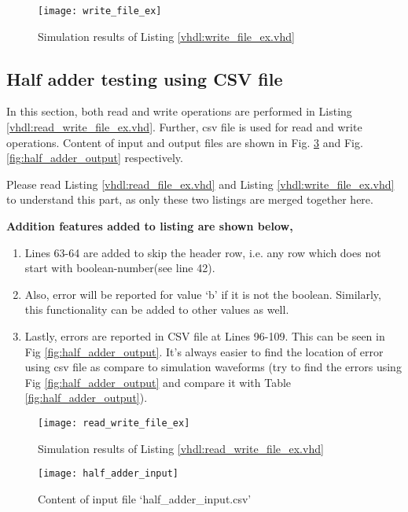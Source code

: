 \begin{figure}[!h]
	\centering
	\texttt{[image: write\_file\_ex]}
	\caption{Simulation results of Listing \ref{vhdl:write_file_ex.vhd} }
	\label{fig:write_file_ex}
\end{figure}


\subsection{Half adder testing using CSV file}
In this section, both read and write operations are performed in Listing \ref{vhdl:read_write_file_ex.vhd}. Further, csv file is used for read and write operations. Content of input and output files are shown in Fig. \ref{fig:half_adder_input} and Fig. \ref{fig:half_adder_output} respectively. 

Please read Listing \ref{vhdl:read_file_ex.vhd} and Listing \ref{vhdl:write_file_ex.vhd} to understand this part, as only these two listings are merged together here. 

\textbf{Addition features added to listing are shown below, }
\begin{enumerate}
	\item Lines 63-64 are added to skip the header row, i.e. any row which does not start with boolean-number(see line 42).
	\item  Also, error will be reported for value `b' if it is not the boolean. Similarly, this functionality can be added to other values as well.
	\item Lastly, errors are reported in CSV file at Lines 96-109. This can be seen in Fig \ref{fig:half_adder_output}. It's always easier to find the location of error using csv file as compare to simulation waveforms (try to find the errors using Fig \ref{fig:half_adder_output} and compare it with Table \ref{fig:half_adder_output}).  
	
\end{enumerate}




\begin{figure}[!h]
	\centering
	\texttt{[image: read\_write\_file\_ex]}
	\caption{Simulation results of Listing \ref{vhdl:read_write_file_ex.vhd}}
	\label{fig:read_write_file_ex}
\end{figure}

\begin{figure}[!h]
	\centering
	\texttt{[image: half\_adder\_input]}
	\caption{Content of input file `half\_adder\_input.csv'}
	\label{fig:half_adder_input}
\end{figure}

